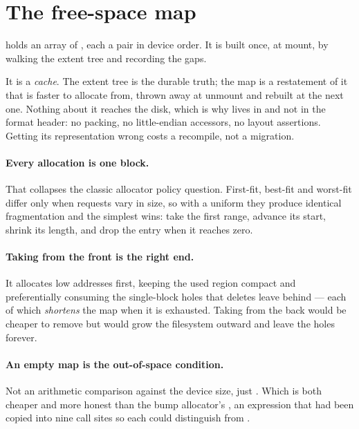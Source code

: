 \section{The free-space map}

 holds an array of
, each a  pair in
device order. It is built once, at mount, by walking the extent tree and
recording the gaps.

It is a \emph{cache}. The extent tree is the durable truth; the map is a
restatement of it that is faster to allocate from, thrown away at unmount and
rebuilt at the next one. Nothing about it reaches the disk, which is why
 lives in  and not in the format
header: no packing, no little-endian accessors, no layout assertions. Getting
its representation wrong costs a recompile, not a migration.

\paragraph{Every allocation is one block.} That collapses the classic allocator
policy question. First-fit, best-fit and worst-fit differ only when requests
vary in size, so with a uniform  they produce identical
fragmentation and the simplest wins: take the first range, advance its start,
shrink its length, and drop the entry when it reaches zero.

\paragraph{Taking from the front is the right end.} It allocates low addresses
first, keeping the used region compact and preferentially consuming the
single-block holes that deletes leave behind --- each of which \emph{shortens}
the map when it is exhausted. Taking from the back would be cheaper to remove
but would grow the filesystem outward and leave the holes forever.

\paragraph{An empty map is the out-of-space condition.} Not an arithmetic
comparison against the device size, just . Which is both
cheaper and more honest than the bump allocator's
, an expression that had been copied
into nine call sites so each could distinguish  from
.


